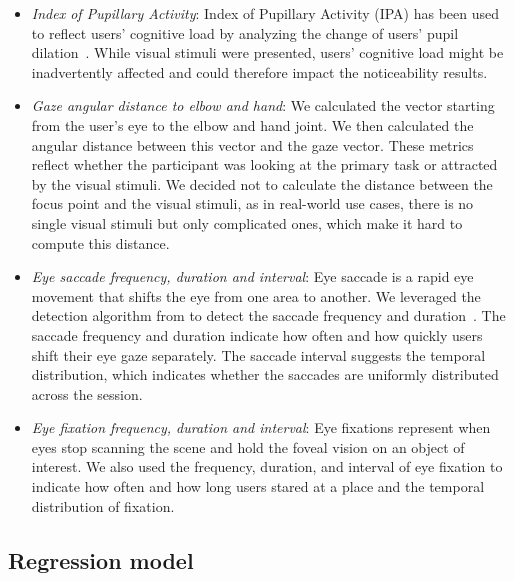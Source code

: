 \begin{itemize}
    \item \textit{Index of Pupillary Activity}: 
    Index of Pupillary Activity (IPA) has been used to reflect users' cognitive load by analyzing the change of users' pupil dilation~\cite{duchowski2018index, lindlbauer2019context}. 
    While visual stimuli were presented, users' cognitive load might be inadvertently affected and could therefore impact the noticeability results.
    \item \textit{Gaze angular distance to elbow and hand}:  
    We calculated the vector starting from the user's eye to the elbow and hand joint. 
    We then calculated the angular distance between this vector and the gaze vector.
    These metrics reflect whether the participant was looking at the primary task or attracted by the visual stimuli.
    We decided not to calculate the distance between the focus point and the visual stimuli, as in real-world use cases, there is no single visual stimuli but only complicated ones, which make it hard to compute this distance.
    \item \textit{Eye saccade frequency, duration and interval}:
    Eye saccade is a rapid eye movement that shifts the eye from one area to another.
    We leveraged the detection algorithm from \citeauthor{pymovements} to detect the saccade frequency and duration~\cite{pymovements}. 
    The saccade frequency and duration indicate how often and how quickly users shift their eye gaze separately.
    The saccade interval suggests the temporal distribution, which indicates whether the saccades are uniformly distributed across the session.
    \item \textit{Eye fixation frequency, duration and interval}:
    Eye fixations represent when eyes stop scanning the scene and hold the foveal vision on an object of interest. 
    We also used the frequency, duration, and interval of eye fixation to indicate how often and how long users stared at a place and the temporal distribution of fixation.
\end{itemize}

\subsection{Regression model}

